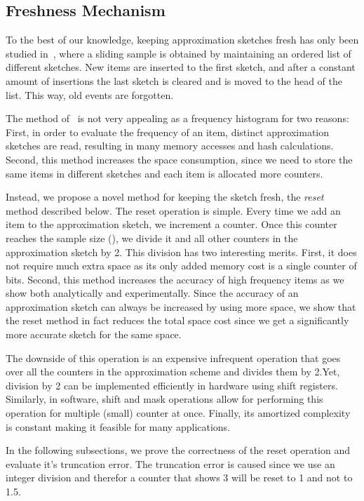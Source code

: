 \documentclass[10pt,a4paper]{article}
\begin{document}
\subsection{Freshness Mechanism}
To the best of our knowledge, keeping approximation sketches fresh has only been studied in~\cite{SUNSHINE}, where a sliding sample is obtained by maintaining an ordered list of  different sketches.
New items are inserted to the first sketch, and after a constant amount of insertions the last sketch is cleared and is moved to the head of the list.
This way, old events are forgotten. 

The method of~\cite{SUNSHINE} is not very appealing as a frequency histogram for two reasons:
First, in order to evaluate the frequency of an item,  distinct approximation sketches are read, resulting in many memory accesses and hash calculations.
Second, this method increases the space consumption, since we need to store the same items in  different sketches and each item is allocated more counters.

Instead, we propose a novel method for keeping the sketch fresh, the \emph{reset} method described below.
The reset operation is simple. Every time we add an item to the approximation sketch, we increment a counter.
Once this counter reaches the sample size (), we divide it and all other counters in the approximation sketch by 2.
This division has two interesting merits. First, it does not require much extra space as its only added memory cost is a single counter of  bits.
Second, this method increases the accuracy of high frequency items as we show both analytically and experimentally. Since the accuracy of an approximation
sketch can always be increased by using more space, we show that the reset method in fact reduces the total space cost since we get a significantly more
accurate sketch for the same space.

The downside of this operation is an expensive infrequent operation that goes over all the counters in the approximation scheme and divides them by 2.Yet, division by 2 can be implemented efficiently in hardware using shift registers.
Similarly, in software, shift and mask operations allow for performing this operation for multiple (small) counter at once. Finally, its amortized complexity is constant making it feasible for many applications.


In the following subsections, we prove the correctness of the reset operation and evaluate it's truncation error. The truncation error is caused since we use an integer division and therefor a counter that shows 3 will be reset to 1 and not to 1.5.
\end{document}

